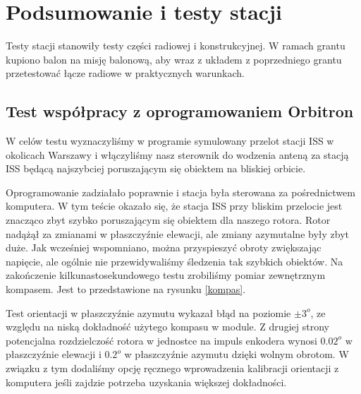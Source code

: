 \section{Podsumowanie i testy stacji}

Testy stacji stanowiły testy części radiowej i konstrukcyjnej. W ramach grantu kupiono balon na misję balonową, aby wraz z układem z poprzedniego grantu przetestować łącze radiowe w praktycznych warunkach.

\subsection{Test współpracy z oprogramowaniem Orbitron}

W celów testu wyznaczyliśmy w programie symulowany przelot stacji ISS w okolicach Warszawy i włączyliśmy nasz sterownik do wodzenia anteną za stacją ISS będącą najszybciej poruszającym się obiektem na bliskiej orbicie.

Oprogramowanie zadziałało poprawnie i stacja była sterowana za pośrednictwem komputera. W tym teście okazało się, że stacja ISS przy bliskim przelocie jest znacząco zbyt szybko poruszającym się obiektem dla naszego rotora. Rotor nadążął za zmianami w płaszczyźnie elewacji, ale zmiany azymutalne były zbyt duże. Jak wcześniej wspomniano, można przyspieszyć obroty zwiększając napięcie, ale ogólnie nie przewidywaliśmy śledzenia tak szybkich obiektów. Na zakończenie kilkunastosekundowego testu zrobiliśmy pomiar zewnętrznym kompasem. Jest to przedstawione na rysunku \ref{kompas}.

Test orientacji w płaszczyźnie azymutu wykazał błąd na poziomie $\pm 3^o$, ze względu na niską dokładność użytego kompasu w module. Z drugiej strony potencjalna rozdzielczość rotora w jednostce na impuls enkodera wynosi $0.02^o$ w płaszczyźnie elewacji i $0.2^o$ w płaszczyźnie azymutu dzięki wolnym obrotom. W związku z tym dodaliśmy opcję ręcznego wprowadzenia kalibracji orientacji z komputera jeśli zajdzie potrzeba uzyskania większej dokładności.

